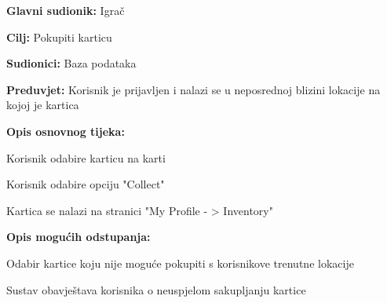 					\noindent {}
					\begin{packed_item}
	
						\item \textbf{Glavni sudionik: }Igrač
						\item  \textbf{Cilj:} Pokupiti karticu
						\item  \textbf{Sudionici:} Baza podataka
						\item  \textbf{Preduvjet:} Korisnik je prijavljen i nalazi se u neposrednoj blizini lokacije na kojoj je kartica
						\item  \textbf{Opis osnovnog tijeka:}
						
						\item[] \begin{packed_enum}
	
							\item Korisnik odabire karticu na karti
							\item Korisnik odabire opciju "Collect"
							\item Kartica se nalazi na stranici "My Profile - > Inventory" 

						\end{packed_enum}
						
						\item  \textbf{Opis mogućih odstupanja:}
						
						\item[] \begin{packed_item}
	
							\item[2.a] Odabir kartice koju nije moguće pokupiti s korisnikove trenutne lokacije
							\item[] \begin{packed_enum}
								
								\item Sustav obavještava korisnika o neuspjelom sakupljanju kartice
								
							\end{packed_enum}
							
						\end{packed_item}
					\end{packed_item}
					
